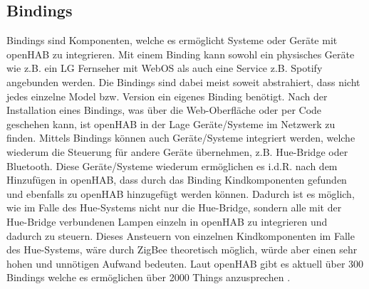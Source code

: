 \subsection{Bindings} \label{sec:Bindings}
Bindings sind Komponenten, welche es ermöglicht Systeme oder Geräte mit openHAB zu integrieren. Mit einem Binding kann sowohl ein physisches Geräte wie z.B. ein LG Fernseher mit WebOS als auch eine Service z.B. Spotify angebunden werden. Die Bindings sind dabei meist soweit abstrahiert, dass nicht jedes einzelne Model bzw. Version ein eigenes Binding benötigt.
Nach der Installation eines Bindings, was über die Web-Oberfläche oder per Code geschehen kann, ist openHAB in der Lage Geräte/Systeme im Netzwerk zu finden. Mittels Bindings können auch Geräte/Systeme integriert werden, welche wiederum die Steuerung für andere Geräte übernehmen, z.B. Hue-Bridge oder Bluetooth. Diese Geräte/Systeme wiederum ermöglichen es i.d.R. nach dem Hinzufügen in openHAB, dass durch das Binding Kindkomponenten gefunden und ebenfalls zu openHAB hinzugefügt werden können. Dadurch ist es möglich, wie im Falle des Hue-Systems nicht nur die Hue-Bridge, sondern alle mit der Hue-Bridge verbundenen Lampen einzeln in openHAB zu integrieren und dadurch zu steuern. Dieses Ansteuern von einzelnen Kindkomponenten im Falle des Hue-Systems, wäre durch ZigBee theoretisch möglich, würde aber einen sehr hohen und unnötigen Aufwand bedeuten.
Laut openHAB gibt es aktuell über 300 Bindings welche es ermöglichen über 2000 Things anzusprechen \cite{OPENHUB00:OH}.

